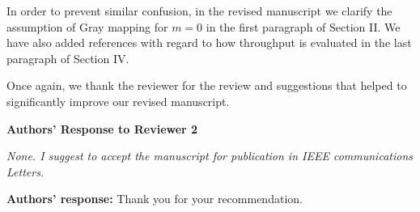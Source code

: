 \documentclass[onecolumn, 11pt, draftclsnofoot]{IEEEtran}
\begin{document}
In order to prevent similar confusion, in the revised manuscript we clarify the
assumption of Gray mapping for $m=0$ in the first paragraph of Section II. We
have also added references with regard to how throughput is evaluated in the
last paragraph of Section IV.
\vspace{0.5cm}


Once again, we thank the reviewer for the review and suggestions that helped to
significantly improve our revised manuscript. 



\newpage
\begin{center}
{\LARGE \textbf{Authors' Response to Reviewer 2}}
\end{center}

\noindent
\emph{None. I suggest to accept the manuscript for publication in IEEE
communications Letters.}

\noindent \textbf{Authors' response:}
Thank you for your recommendation.

\vspace{0.5cm}



\end{document}
